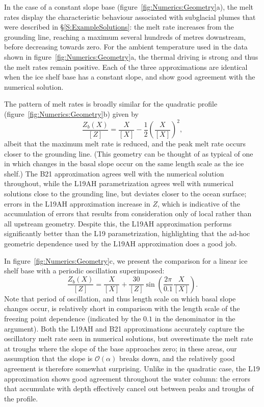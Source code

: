 \documentclass{jfm}
\newcommand{\order}[1]{\mathcal{O}(#1)}
\begin{document}
In the case of a constant slope base (figure~\ref{fig:Numerics:Geometry}a), the melt rates display the characteristic behaviour associated with subglacial plumes that were described in \S\ref{S:ExampleSolutions}: the melt rate increases from the grounding line, reaching a maximum several hundreds of metres downstream, before decreasing towards zero. For the ambient temperature used in the data shown in figure~\ref{fig:Numerics:Geometry}a, the thermal driving is strong and thus the melt rates remain positive. Each of the three approximations are identical when the ice shelf base has a constant slope, and show good agreement with the numerical solution.

The pattern of melt rates is broadly similar for the quadratic profile (figure~\ref{fig:Numerics:Geometry}b) given by
\begin{equation}\label{E:Numerics:QuadraticGeometry}
\frac{Z_b(X)}{\left[Z\right]}= \frac{X}{\left[X\right]} - \frac{1}{2}\left(\frac{X}{\left[X\right]}\right)^2,
\end{equation}
albeit that the maximum melt rate is reduced, and the peak melt rate occurs closer to the grounding line. (This geometry can be thought of as typical of one in which changes in the basal slope occur on the same length scale as the ice shelf.) The B21 approximation agrees well with the numerical solution throughout, while the L19AH parametrization agrees well with numerical solutions close to the grounding line, but deviates closer to the ocean surface; errors in the L19AH approximation increase in $Z$, which is indicative of the accumulation of errors that results from consideration only of local rather than all upstream geometry. Despite this, the L19AH approximation performs significantly better than the L19 parametrization, highlighting that the ad-hoc geometric dependence used by the L19AH approximation does a good job. 

In figure~\ref{fig:Numerics:Geometry}c, we present the comparison for a linear ice shelf base with a periodic oscillation superimposed:
\begin{equation}\label{E:Numerics:SinusoidalGeometry}
\frac{Z_b(X)}{\left[Z\right]}= \frac{X}{\left[X\right]} + \frac{30}{\left[Z\right]}\sin\left(\frac{2\pi}{0.1}\frac{ X}{\left[X\right]}\right).
\end{equation}
Note that period of oscillation, and thus length scale on which basal slope changes occur, is relatively short in comparison with the length scale of the freezing point dependence (indicated by the $0.1$ in the denominator in the argument). Both the L19AH and B21 approximations accurately capture the oscillatory melt rate seen in numerical solutions, but overestimate the melt rate at troughs where the slope of the base approaches zero; in these areas, our assumption that the slope is $\order{\alpha}$ breaks down, and the relatively good agreement is therefore somewhat surprising. Unlike in the quadratic case, the L19 approximation shows good agreement throughout the water column: the errors that accumulate with depth effectively cancel out between peaks and troughs of the profile.  
\end{document}
